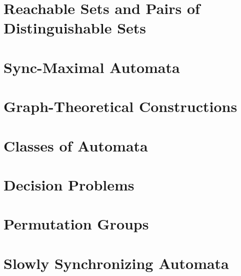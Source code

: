 \chapter{Reachable Sets and Pairs of Distinguishable Sets}
\label{sync_max:chap:prelim}



\chapter{Sync-Maximal Automata}
\label{sync_max:chap:sync_max}



\chapter{Graph-Theoretical Constructions}
\label{sync_max:chap:graphs}



\chapter{Classes of Automata}
\label{sync_max:sec:subclasses}



\chapter{Decision Problems}
\label{sync_max:chap:decision}



\chapter{Permutation Groups}
\label{sync_max:sec:perm_grps}



\chapter{Slowly Synchronizing Automata}
\label{sync_max:chap:slowly}

